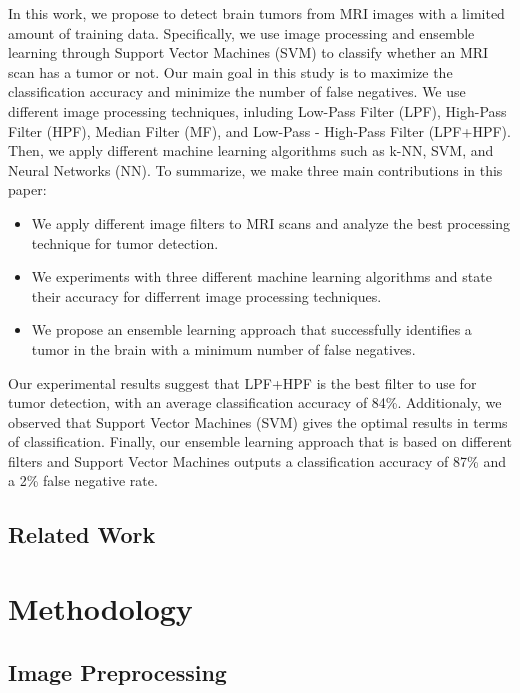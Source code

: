 \documentclass[conference]{IEEEtran}
\begin{document}
In this work, we propose to detect brain tumors from MRI images with a limited amount of training data. Specifically, we use image processing and ensemble learning through Support Vector Machines (SVM) to classify whether an MRI scan has a tumor or not. Our main goal in this study is to maximize the classification accuracy and minimize the number of false negatives. We use different image processing techniques, inluding Low-Pass Filter (LPF), High-Pass Filter (HPF), Median Filter (MF), and Low-Pass - High-Pass Filter (LPF+HPF). Then, we apply different machine learning algorithms such as k-NN, SVM, and Neural Networks (NN). To summarize, we make three main contributions in this paper:
\begin{itemize}
  \item We apply different image filters to MRI scans and analyze the best processing technique for tumor detection.
  \item We experiments with three different machine learning algorithms and state their accuracy for differrent image processing techniques.
  \item We propose an ensemble learning approach that successfully identifies a tumor in the brain with a minimum number of false negatives. 
\end{itemize}
Our experimental results suggest that LPF+HPF is the best filter to use for tumor detection, with an average classification accuracy of 84\%. Additionaly, we observed that Support Vector Machines (SVM) gives the optimal results in terms of classification. Finally, our ensemble learning approach that is based on different filters and Support Vector Machines outputs a classification accuracy of 87\% and a 2\% false negative rate. 

\subsection{Related Work} 

\section{Methodology}\label{method}

\subsection{Image Preprocessing}
\end{document}
